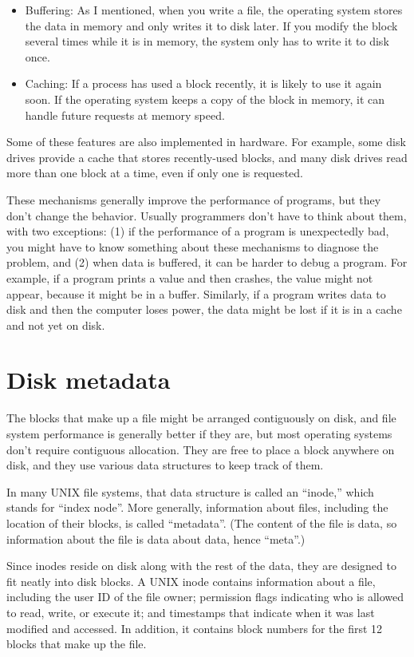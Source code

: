 \documentclass[12pt]{book}
\begin{document}
{\begin{itemize}
\item Buffering: As I mentioned, when you write a file, the operating
  system stores the data in memory and only writes it to disk later.
  If you modify the block several times while it is in memory, the
  system only has to write it to disk once.

\item Caching: If a process has used a block recently, it is likely to
  use it again soon.  If the operating system keeps a copy of the
  block in memory, it can handle future requests at memory speed.

\end{itemize}

Some of these features are also implemented in hardware.  For example,
some disk drives provide a cache that stores recently-used blocks,
and many disk drives read more than one block at a time, even if only
one is requested.

These mechanisms generally improve the performance of
programs, but they don't change the behavior.  Usually programmers
don't have to think about them, with two exceptions: (1) if the
performance of a program is unexpectedly bad, you might have to know
something about these mechanisms to diagnose the problem, and (2)
when data is buffered, it can be harder to debug a program.  For
example, if a program prints a value and then crashes, the value
might not appear, because it might be in a buffer.  Similarly, if a
program writes data to disk and then the computer loses power, the
data might be lost if it is in a cache and not yet on disk.


\section{Disk metadata}

The blocks that make up a file might be arranged contiguously on
disk, and file system performance is generally better if they are,
but most operating systems don't require contiguous allocation.
They are free to place a block anywhere on disk, and they use
various data structures to keep track of them.

In many UNIX file systems, that data structure is called an ``inode,''
which stands for ``index node''.  More generally, information about
files, including the location of their blocks, is called ``metadata''.
(The content of the file is data, so information about the file is
data about data, hence ``meta''.)

Since inodes reside on disk along with the rest of the data, they are
designed to fit neatly into disk blocks.  A UNIX inode contains
information about a file, including the user ID of the file owner;
permission flags indicating who is allowed to read, write, or execute
it; and timestamps that indicate when it was last modified and
accessed.  In addition, it contains block numbers for the first 12
blocks that make up the file.

}
\end{document}
